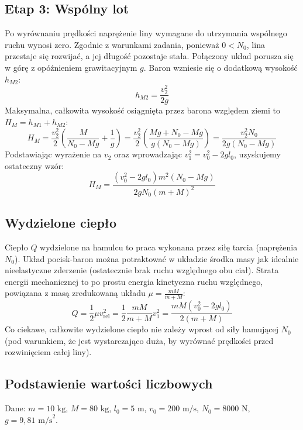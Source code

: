 \documentclass[a4paper,12pt]{article}
\begin{document}
\subsection*{Etap 3: Wspólny lot}
Po wyrównaniu prędkości naprężenie liny wymagane do utrzymania wspólnego ruchu wynosi zero. Zgodnie z warunkami zadania, ponieważ $0 < N_0$, lina przestaje się rozwijać, a jej długość pozostaje stała. Połączony układ porusza się w górę z opóźnieniem grawitacyjnym $g$. 
Baron wzniesie się o dodatkową wysokość $h_{M2}$:
\begin{equation}
h_{M2} = \frac{v_2^2}{2g}
\end{equation}
Maksymalna, całkowita wysokość osiągnięta przez barona względem ziemi to $H_M = h_{M1} + h_{M2}$:
\begin{equation}
H_M = \frac{v_2^2}{2} \left( \frac{M}{N_0 - Mg} + \frac{1}{g} \right) = \frac{v_2^2}{2} \left( \frac{Mg + N_0 - Mg}{g(N_0 - Mg)} \right) = \frac{v_2^2 N_0}{2g(N_0 - Mg)}
\end{equation}
Podstawiając wyrażenie na $v_2$ oraz wprowadzając $v_1^2 = v_0^2 - 2gl_0$, uzyskujemy ostateczny wzór:
\begin{equation}
H_M = \frac{\left(v_0^2 - 2gl_0\right) m^2 (N_0 - Mg)}{2g N_0 (m+M)^2}
\end{equation}

\subsection*{Wydzielone ciepło}
Ciepło $Q$ wydzielone na hamulcu to praca wykonana przez siłę tarcia (naprężenia $N_0$). Układ pocisk-baron można potraktować w układzie środka masy jak idealnie nieelastyczne zderzenie (ostatecznie brak ruchu względnego obu ciał). Strata energii mechanicznej to po prostu energia kinetyczna ruchu względnego, powiązana z masą zredukowaną układu $\mu = \frac{mM}{m+M}$:
\begin{equation}
Q = \frac{1}{2} \mu v_{\text{rel}}^2 = \frac{1}{2} \frac{mM}{m+M} v_1^2 = \frac{mM(v_0^2 - 2gl_0)}{2(m+M)}
\end{equation}
Co ciekawe, całkowite wydzielone ciepło nie zależy wprost od siły hamującej $N_0$ (pod warunkiem, że jest wystarczająco duża, by wyrównać prędkości przed rozwinięciem całej liny).

\subsection*{Podstawienie wartości liczbowych}
Dane: $m = 10 \text{ kg}$, $M = 80 \text{ kg}$, $l_0 = 5 \text{ m}$, $v_0 = 200 \text{ m/s}$, $N_0 = 8000 \text{ N}$, $g = 9,81 \text{ m/s}^2$.
\end{document}
